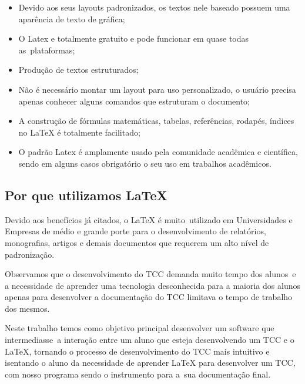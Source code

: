 \bigskip

\liststyleLFOiii
\begin{itemize}
\item {
\textrm{Devido aos seus layouts padronizados, os textos nele baseado possuem uma apar\^encia de texto de gr\'afica;}}
\item {
O Latex e totalmente gratuito e pode funcionar em quase todas as\ plataformas;}
\item {
Produ\c{c}\~ao de textos estruturados;}
\item {
N\~ao \'e necess\'ario montar um layout para uso personalizado, o usu\'ario precisa apenas conhecer alguns comandos que
estruturam o documento;}
\item {
A constru\c{c}\~ao de f\'ormulas matem\'aticas, tabelas, refer\^encias, rodap\'es, \'indices no {\LaTeX} \'e totalmente
facilitado;}
\item {
O padr\~ao Latex \'e amplamente usado pela comunidade acad\^emica e cient\'ifica, sendo em alguns casos obrigat\'orio o
seu uso em trabalhos acad\^emicos.}
\end{itemize}

\bigskip

\subsection[Por que utilizamos LaTeX]{ Por que utilizamos {\LaTeX}}

\bigskip

{
Devido aos benef\'icios j\'a citados, o {\LaTeX} \'e muito\ utilizado em Universidades e Empresas de m\'edio e grande
porte para o desenvolvimento de relat\'orios, monografias, artigos e demais documentos que requerem um alto n\'ivel de
padroniza\c{c}\~ao.}

{
Observamos que o desenvolvimento do TCC demanda muito tempo dos alunos\ e a necessidade de aprender uma tecnologia
desconhecida para a maioria dos alunos apenas para desenvolver a documenta\c{c}\~ao do TCC limitava o tempo de trabalho
dos mesmos.}

{
Neste trabalho temos como objetivo principal desenvolver um software que intermediasse\ a intera\c{c}\~ao entre um aluno
que esteja desenvolvendo um TCC e o {\LaTeX}, tornando o processo de desenvolvimento do TCC mais intuitivo e isentando
o aluno da necessidade de aprender {\LaTeX} para desenvolver um TCC, com nosso programa sendo o instrumento para a\ sua
documenta\c{c}\~ao final.}


\bigskip

